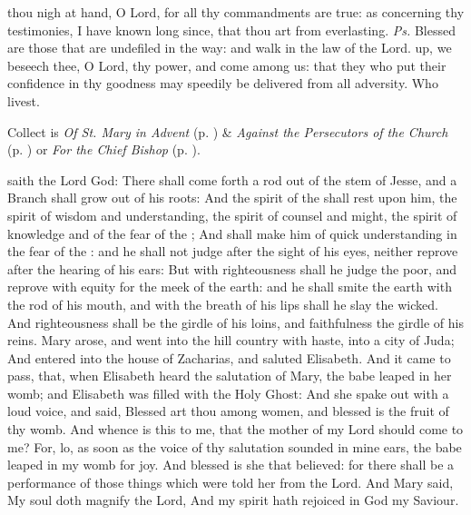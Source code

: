 \introit
{} thou nigh at hand, O Lord, for all thy commandments are true: as concerning thy testimonies, I have known long since, that thou art from everlasting. \textit{Ps.} Blessed are those that are undefiled in the way: and walk in the law of the Lord.
\collect
{} up, we beseech thee, O Lord, thy power, and come among us: that they who put their confidence in thy goodness may speedily be delivered from all adversity. Who livest.
\begin{rubric}
     Collect is \emph{Of St. Mary in Advent} (p. \pageref{SPMaryInAdvent}) \&  \emph{Against the Persecutors of the Church} (p. \pageref{SPAgainst}) or \emph{For the Chief Bishop} (p. \pageref{SPChiefBishop}).
\end{rubric}
 saith the Lord God: There shall come forth a rod out of the stem of Jesse, and a Branch shall grow out of his roots: And the spirit of the  shall rest upon him, the spirit of wisdom and understanding, the spirit of counsel and might, the spirit of knowledge and of the fear of the ; And shall make him of quick understanding in the fear of the : and he shall not judge after the sight of his eyes, neither reprove after the hearing of his ears: But with righteousness shall he judge the poor, and reprove with equity for the meek of the earth: and he shall smite the earth with the rod of his mouth, and with the breath of his lips shall he slay the wicked. And righteousness shall be the girdle of his loins, and faithfulness the girdle of his reins.
 Mary arose, and went into the hill country with haste, into a city of Juda; And entered into the house of Zacharias, and saluted Elisabeth. And it came to pass, that, when Elisabeth heard the salutation of Mary, the babe leaped in her womb; and Elisabeth was filled with the Holy Ghost: And she spake out with a loud voice, and said, Blessed art thou among women, and blessed is the fruit of thy womb. And whence is this to me, that the mother of my Lord should come to me? For, lo, as soon as the voice of thy salutation sounded in mine ears, the babe leaped in my womb for joy. And blessed is she that believed: for there shall be a performance of those things which were told her from the Lord. And Mary said, My soul doth magnify the Lord, And my spirit hath rejoiced in God my Saviour.
